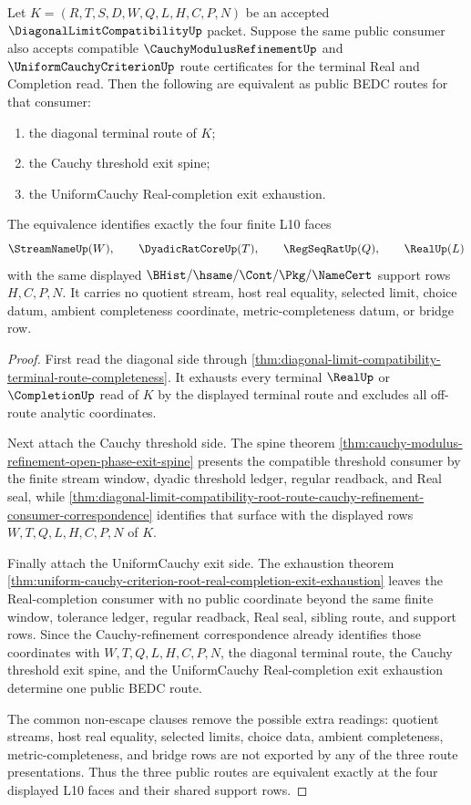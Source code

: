 \begin{theorem}
\label{thm:diagonal-limit-compatibility-four-face-consumer-equivalence}
Let $K=(R,T,S,D,W,Q,L,H,C,P,N)$ be an accepted $\DiagonalLimitCompatibilityUp$ packet. Suppose the same public consumer also accepts compatible $\CauchyModulusRefinementUp$ and $\UniformCauchyCriterionUp$ route certificates for the terminal Real and Completion read. Then the following are equivalent as public BEDC routes for that consumer:
\begin{enumerate}
\item the diagonal terminal route of $K$;
\item the Cauchy threshold exit spine;
\item the UniformCauchy Real-completion exit exhaustion.
\end{enumerate}
The equivalence identifies exactly the four finite L10 faces
$$
\StreamNameUp(W),\qquad
\DyadicRatCoreUp(T),\qquad
\RegSeqRatUp(Q),\qquad
\RealUp(L)
$$
with the same displayed $\BHist/\hsame/\Cont/\Pkg/\NameCert$ support rows $H,C,P,N$. It carries no quotient stream, host real equality, selected limit, choice datum, ambient completeness coordinate, metric-completeness datum, or bridge row.
\end{theorem}
\begin{proof}
First read the diagonal side through \autoref{thm:diagonal-limit-compatibility-terminal-route-completeness}. It exhausts every terminal $\RealUp$ or $\CompletionUp$ read of $K$ by the displayed terminal route and excludes all off-route analytic coordinates.

Next attach the Cauchy threshold side. The spine theorem \autoref{thm:cauchy-modulus-refinement-open-phase-exit-spine} presents the compatible threshold consumer by the finite stream window, dyadic threshold ledger, regular readback, and Real seal, while \autoref{thm:diagonal-limit-compatibility-root-route-cauchy-refinement-consumer-correspondence} identifies that surface with the displayed rows $W,T,Q,L,H,C,P,N$ of $K$.

Finally attach the UniformCauchy exit side. The exhaustion theorem \autoref{thm:uniform-cauchy-criterion-root-real-completion-exit-exhaustion} leaves the Real-completion consumer with no public coordinate beyond the same finite window, tolerance ledger, regular readback, Real seal, sibling route, and support rows. Since the Cauchy-refinement correspondence already identifies those coordinates with $W,T,Q,L,H,C,P,N$, the diagonal terminal route, the Cauchy threshold exit spine, and the UniformCauchy Real-completion exit exhaustion determine one public BEDC route.

The common non-escape clauses remove the possible extra readings: quotient streams, host real equality, selected limits, choice data, ambient completeness, metric-completeness, and bridge rows are not exported by any of the three route presentations. Thus the three public routes are equivalent exactly at the four displayed L10 faces and their shared support rows.
\end{proof}


